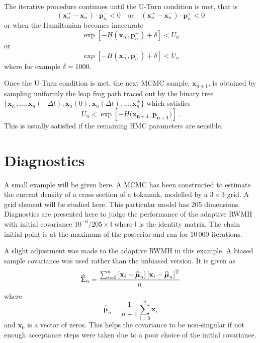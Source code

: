 \documentclass[10pt]{proc}
\newcommand{\T}{^\textup{T}}
\newcommand{\dotdotdot}{...}
\newcommand{\vect}[1]{\mathbf{#1}}
\newcommand{\vectGreek}[1]{\boldsymbol{#1}}
\newcommand{\matr}[1]{\mathsf{#1}}
\begin{document}
The iterative procedure continues until the U-Turn condition is met, that is
\begin{equation}
(\vect{x}_n^+ - \vect{x}_n^-)\cdot \vect{p}_n^- < 0
\quad \text{or} \quad
(\vect{x}_n^+ - \vect{x}_n^-)\cdot \vect{p}_n^+ < 0
\end{equation}
or when the Hamiltonian becomes inaccurate
\begin{equation}
\exp\left[-H(\vect{x}_n^{+},\vect{p}_n^{+})+\delta\right]<U_n
\end{equation}
or
\begin{equation}
\exp\left[-H(\vect{x}_n^{-},\vect{p}_n^{-})+\delta\right]<U_n
\end{equation}
where for example $\delta = 1000$.

Once the U-Turn condition is met, the next MCMC sample, $\vect{x}_{n+1}$, is obtained by sampling uniformly the leap frog path traced out by the binary tree $\{\vect{x}_n^-,\dotdotdot,\vect{x}_n(-\Delta t),\vect{x}_n(0),\vect{x}_n(\Delta t),\dotdotdot,\vect{x}_n^+\}$ which satisfies
\begin{equation}
U_n<\exp\left[-H(\vect{x_{n+1}},\vect{p_{n+1})}\right] \ .
\label{eq:slice}
\end{equation}
This is usually satisfied if the remaining HMC parameters are sensible.

\section{Diagnostics}
A small example will be given here. A MCMC has been constructed to estimate the current density of a cross section of a tokamak, modelled by a $3\times 3$ grid. A grid element will be studied here. This particular model has 205 dimensions. Diagnostics are presented here to judge the performance of the adaptive RWMH with initial covariance $10^{-6}/205 \times \matr{I}$ where $\matr{I}$ is the identity matrix. The chain initial point is at the maximum of the posterior and ran for 10\,000 iterations.

A slight adjustment was made to the adaptive RWMH in this example. A biased sample covariance was used rather than the unbiased version. It is given as
\begin{equation}
\widehat{\matr{\Sigma}}_n=\dfrac{\sum_{i=0}^n\left[\vect{x}_i-\widehat{\vectGreek{\mu}}_n\right]\left[\vect{x}_i-\widehat{\vectGreek{\mu}}_n\right]\T}{n}
\end{equation}
where
\begin{equation}
\widehat{\vectGreek{\mu}}_n = \dfrac{1}{n+1}\sum_{i=0}^n \vect{x}_i
\end{equation}
and $\vect{x}_0$ is a vector of zeros. This helps the covariance to be non-singular if not enough acceptance steps were taken due to a poor choice of the initial covariance.
\end{document}
